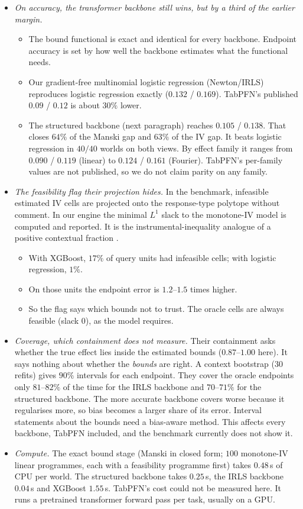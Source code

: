 \documentclass[11pt]{article}
\theoremstyle{definition}
\theoremstyle{remark}
\begin{document}
\begin{itemize}
  \item \emph{On accuracy, the transformer backbone still wins, but by a third of the earlier margin.}
  \begin{itemize}
    \item The bound functional is exact and identical for every backbone. Endpoint accuracy is set by how well the backbone estimates what the functional needs.
    \item Our gradient-free multinomial logistic regression (Newton/IRLS) reproduces logistic regression exactly ($0.132$ / $0.169$). TabPFN's published $0.09$ / $0.12$ is about $30\%$ lower.
    \item The structured backbone (next paragraph) reaches $0.105$ / $0.138$. That closes $64\%$ of the Manski gap and $63\%$ of the IV gap. It beats logistic regression in $40/40$ worlds on both views. By effect family it ranges from $0.090$ / $0.119$ (linear) to $0.124$ / $0.161$ (Fourier). TabPFN's per-family values are not published, so we do not claim parity on any family.
  \end{itemize}
  \item \emph{The feasibility flag their projection hides.} In the benchmark, infeasible estimated IV cells are projected onto the response-type polytope without comment. In our engine the minimal $L^1$ slack to the monotone-IV model is computed and reported. It is the instrumental-inequality analogue of a positive contextual fraction \cite{pearl95}.
  \begin{itemize}
    \item With XGBoost, $17\%$ of query units had infeasible cells; with logistic regression, $1\%$.
    \item On those units the endpoint error is $1.2$--$1.5$ times higher.
    \item So the flag says which bounds not to trust. The oracle cells are always feasible (slack $0$), as the model requires.
  \end{itemize}
  \item \emph{Coverage, which containment does not measure.} Their containment asks whether the true effect lies inside the estimated bounds ($0.87$--$1.00$ here). It says nothing about whether the \emph{bounds} are right. A context bootstrap \cite{efrontibshirani93} ($30$ refits) gives $90\%$ intervals for each endpoint. They cover the oracle endpoints only $81$--$82\%$ of the time for the IRLS backbone and $70$--$71\%$ for the structured backbone. The more accurate backbone covers worse because it regularises more, so bias becomes a larger share of its error. Interval statements about the bounds need a bias-aware method. This affects every backbone, TabPFN included, and the benchmark currently does not show it.
  \item \emph{Compute.} The exact bound stage (Manski in closed form; $100$ monotone-IV linear programmes, each with a feasibility programme first) takes $0.48$\,s of CPU per world. The structured backbone takes $0.25$\,s, the IRLS backbone $0.04$\,s and XGBoost $1.55$\,s. TabPFN's cost could not be measured here. It runs a pretrained transformer forward pass per task, usually on a GPU.
\end{itemize}
\end{document}
